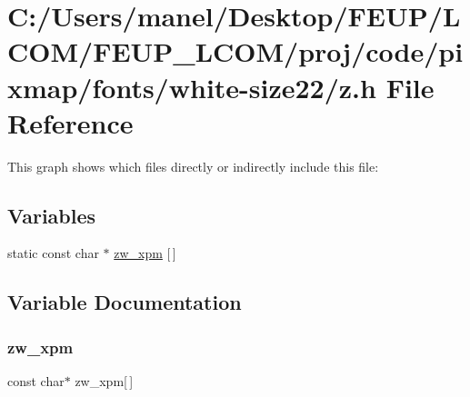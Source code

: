 \hypertarget{white-size22_2z_8h}{}\section{C\+:/\+Users/manel/\+Desktop/\+F\+E\+U\+P/\+L\+C\+O\+M/\+F\+E\+U\+P\+\_\+\+L\+C\+O\+M/proj/code/pixmap/fonts/white-\/size22/z.h File Reference}
\label{white-size22_2z_8h}
This graph shows which files directly or indirectly include this file\+:
\subsection*{Variables}
\begin{DoxyCompactItemize}
\item 
static const char $\ast$ \mbox{\hyperlink{white-size22_2z_8h_ac451e12615d70f97c253be5a25861c3d}{zw\+\_\+xpm}} \mbox{[}$\,$\mbox{]}
\end{DoxyCompactItemize}


\subsection{Variable Documentation}
\mbox{\label{white-size22_2z_8h_ac451e12615d70f97c253be5a25861c3d}} 
\subsubsection{\texorpdfstring{zw\_xpm}{zw\_xpm}}
{\footnotesize\ttfamily const char$\ast$ zw\+\_\+xpm\mbox{[}$\,$\mbox{]}\hspace{0.3cm}{\ttfamily [static]}}

